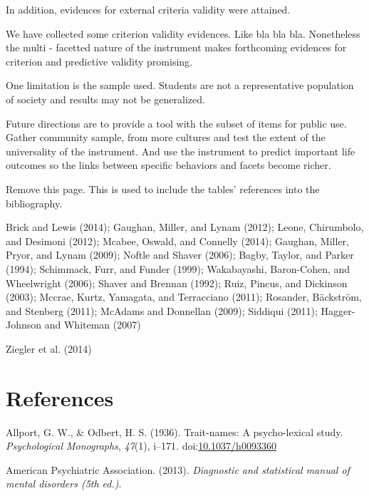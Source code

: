 \documentclass[,man,floatsintext]{apa6}
\theoremstyle{definition}
\theoremstyle{definition}
\theoremstyle{definition}
\theoremstyle{remark}
\begin{document}
In addition, evidences for external criteria validity were attained.

We have collected some criterion validity evidences. Like bla bla bla.
Nonetheless the multi - facetted nature of the instrument makes
forthcoming evidences for criterion and predictive validity promising.

One limitation is the sample used. Students are not a representative
population of society and results may not be generalized.

Future directions are to provide a tool with the subset of items for
public use. Gather community sample, from more cultures and test the
extent of the universality of the instrument. And use the instrument to
predict important life outcomes so the links between specific behaviors
and facets become richer.

\newpage

Remove this page. This is used to include the tables' references into
the bibliography.

Brick and Lewis (2014); Gaughan, Miller, and Lynam (2012); Leone,
Chirumbolo, and Desimoni (2012); Mcabee, Oswald, and Connelly (2014);
Gaughan, Miller, Pryor, and Lynam (2009); Noftle and Shaver (2006);
Bagby, Taylor, and Parker (1994); Schimmack, Furr, and Funder (1999);
Wakabayashi, Baron-Cohen, and Wheelwright (2006); Shaver and Brennan
(1992); Ruiz, Pincus, and Dickinson (2003); Mccrae, Kurtz, Yamagata, and
Terracciano (2011); Rosander, Bäckström, and Stenberg (2011); McAdams
and Donnellan (2009); Siddiqui (2011); Hagger-Johnson and Whiteman
(2007)

Ziegler et al. (2014)

\newpage

\hypertarget{references}{%
\section{References}\label{references}}

\begingroup
\setlength{\parindent}{-0.5in}
\setlength{\leftskip}{0.5in}

\hypertarget{refs}{}
\leavevmode\hypertarget{ref-AllportOdbert1936}{}%
Allport, G. W., \& Odbert, H. S. (1936). Trait-names: A psycho-lexical
study. \emph{Psychological Monographs}, \emph{47}(1), i--171.
doi:\href{https://doi.org/10.1037/h0093360}{10.1037/h0093360}

\leavevmode\hypertarget{ref-APA2013}{}%
American Psychiatric Association. (2013). \emph{Diagnostic and
statistical manual of mental disorders (5th ed.)}.
\end{document}

